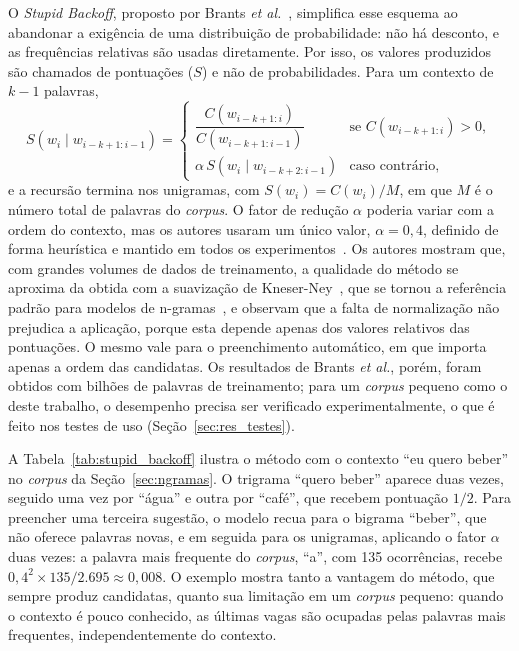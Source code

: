 O \textit{Stupid Backoff}, proposto por Brants \textit{et al.}~\cite{brants2007large}, simplifica esse esquema ao abandonar a exigência de uma distribuição de probabilidade: não há desconto, e as frequências relativas são usadas diretamente. Por isso, os valores produzidos são chamados de pontuações ($S$) e não de probabilidades. Para um contexto de $k-1$ palavras,
\begin{equation}
    S(w_i \mid w_{i-k+1:i-1}) =
    \begin{cases}
        \dfrac{C(w_{i-k+1:i})}{C(w_{i-k+1:i-1})} & \text{se } C(w_{i-k+1:i}) > 0,\\[2ex]
        \alpha\, S(w_i \mid w_{i-k+2:i-1}) & \text{caso contrário,}
    \end{cases}
    \label{eq:stupid_backoff}
\end{equation}
e a recursão termina nos unigramas, com $S(w_i) = C(w_i)/M$, em que $M$ é o número total de palavras do \textit{corpus}. O fator de redução $\alpha$ poderia variar com a ordem do contexto, mas os autores usaram um único valor, $\alpha = 0{,}4$, definido de forma heurística e mantido em todos os experimentos~\cite{brants2007large}. Os autores mostram que, com grandes volumes de dados de treinamento, a qualidade do método se aproxima da obtida com a suavização de Kneser-Ney~\cite{brants2007large}, que se tornou a referência padrão para modelos de n-gramas~\cite[cap.~3]{jurafsky2026slp}, e observam que a falta de normalização não prejudica a aplicação, porque esta depende apenas dos valores relativos das pontuações. O mesmo vale para o preenchimento automático, em que importa apenas a ordem das candidatas. Os resultados de Brants \textit{et al.}, porém, foram obtidos com bilhões de palavras de treinamento; para um \textit{corpus} pequeno como o deste trabalho, o desempenho precisa ser verificado experimentalmente, o que é feito nos testes de uso (Seção~\ref{sec:res_testes}).

A Tabela~\ref{tab:stupid_backoff} ilustra o método com o contexto ``eu quero beber'' no \textit{corpus} da Seção~\ref{sec:ngramas}. O trigrama ``quero beber'' aparece duas vezes, seguido uma vez por ``água'' e outra por ``café'', que recebem pontuação $1/2$. Para preencher uma terceira sugestão, o modelo recua para o bigrama ``beber'', que não oferece palavras novas, e em seguida para os unigramas, aplicando o fator $\alpha$ duas vezes: a palavra mais frequente do \textit{corpus}, ``a'', com 135 ocorrências, recebe $0{,}4^2 \times 135/2.695 \approx 0{,}008$. O exemplo mostra tanto a vantagem do método, que sempre produz candidatas, quanto sua limitação em um \textit{corpus} pequeno: quando o contexto é pouco conhecido, as últimas vagas são ocupadas pelas palavras mais frequentes, independentemente do contexto.

